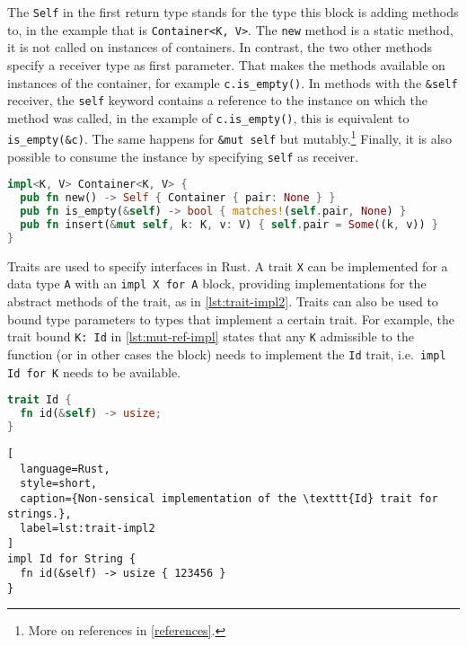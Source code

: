 The \lstinline!Self! in the first return type stands for the type this block is
adding methods to, in the example that is \lstinline!Container<K, V>!. The
\lstinline!new! method is a static method, it is not called on instances of
containers. In contrast, the two other methods specify a receiver type as first
parameter. That makes the methods available on instances of the container, for
example \lstinline!c.is_empty()!. In methods with the \lstinline!&self!
receiver, the \lstinline!self! keyword contains a reference to the instance on
which the method was called, in the example of \lstinline!c.is_empty()!, this is
equivalent to \lstinline!is_empty(&c)!. The same happens for
\passthrough{\lstinline!&mut self!} but mutably.\footnote{More on references in
\autoref{references}.} Finally, it is also possible to consume the instance by
specifying \lstinline!self! as receiver.

\begin{lstlisting}[language=Rust, caption={Methods for the running example.}, label=lst:impl1]
impl<K, V> Container<K, V> {
  pub fn new() -> Self { Container { pair: None } }
  pub fn is_empty(&self) -> bool { matches!(self.pair, None) }
  pub fn insert(&mut self, k: K, v: V) { self.pair = Some((k, v)) }
}
\end{lstlisting}

Traits are used to specify interfaces in Rust. A trait \lstinline!X! can be
implemented for a data type \lstinline!A! with an \passthrough{\lstinline!impl X
for A!} block, providing implementations for the abstract methods of the trait,
as in \autoref{lst:trait-impl2}. Traits can also be used to bound type
parameters to types that implement a certain trait. For example, the trait bound
\lstinline!K: Id!  in \autoref{lst:mut-ref-impl} states that any \lstinline!K!
admissible to the function (or in other cases the block) needs to implement the
\lstinline!Id! trait, i.e.~\passthrough{\lstinline!impl Id for K!} needs to be
available.

\noindent\begin{minipage}[t]{.45\textwidth}
\begin{lstlisting}[language=Rust, style=short, caption={Rust trait with one abstract method.}, label=lst:trait-impl1]
trait Id {
  fn id(&self) -> usize;
}
\end{lstlisting}
\end{minipage}\hfill
\begin{minipage}[t]{.45\textwidth}
\begin{lstlisting}[
  language=Rust,
  style=short,
  caption={Non-sensical implementation of the \texttt{Id} trait for strings.},
  label=lst:trait-impl2
]
impl Id for String {
  fn id(&self) -> usize { 123456 }
}
\end{lstlisting}
\end{minipage}

